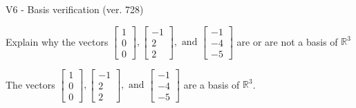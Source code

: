 \begin{exercise}
  \begin{exerciseTitle}V6 - Basis verification (ver. 728)\end{exerciseTitle}
  \begin{exerciseStatement}
    Explain why the vectors \(\left[\begin{array}{r}
1 \\
0 \\
0
\end{array}\right] , \left[\begin{array}{r}
-1 \\
2 \\
2
\end{array}\right] , \text{ and } \left[\begin{array}{r}
-1 \\
-4 \\
-5
\end{array}\right]\) are or are not a basis of \(\mathbb{R}^3\)	


  \end{exerciseStatement}
  \begin{exerciseAnswer}
   The vectors \(\left[\begin{array}{r}
1 \\
0 \\
0
\end{array}\right] , \left[\begin{array}{r}
-1 \\
2 \\
2
\end{array}\right] , \text{ and } \left[\begin{array}{r}
-1 \\
-4 \\
-5
\end{array}\right]\) 
  	 are  a basis of \(\mathbb{R}^3\).
  


  \end{exerciseAnswer}
\end{exercise}